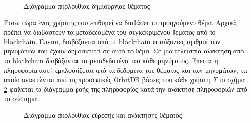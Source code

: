 \vspace{\baselineskip}

\begin{figure}[H]
    \centering
    
    \caption{Διάγραμμα ακολουθίας δημιουργίας θέματος}
    \label{figure:4-3-data-flow-insert}
\end{figure}

\newpage
Έστω τώρα ένας χρήστης που επιθυμεί να διαβάσει το προηγούμενο θέμα. Αρχικά, πρέπει να διαβαστούν τα μεταδεδομένα του συγκεκριμένου θέματος από το blockchain. Έπειτα, διαβάζονται από το blockchain οι αύξοντες αριθμοί των μηνυμάτων που έχουν δημοσιευτεί σε αυτό το θέμα. Σε μία τελευταία ανάκτηση από το blockchain διαβάζονται τα μεταδεδομένα του κάθε μηνύματος. Έπειτα, η πληροφορία αυτή εμπλουτίζεται από τα δεδομένα του θέματος και των μηνυμάτων, τα οποία ανακτώνται από τις προσωπικές OrbitDB βάσεις του κάθε χρήστη. Στο σχήμα \ref{figure:4-3-data-flow-read} φαίνεται το διάγραμμα ροής της πληροφορίας κατά την ανάκτηση πληροφοριών από το σύστημα.

\vspace{\baselineskip}

\begin{figure}[H]
    \centering
    
    \caption{Διάγραμμα ακολουθίας εύρεσης και ανάκτησης θέματος}
    \label{figure:4-3-data-flow-read}
\end{figure}
